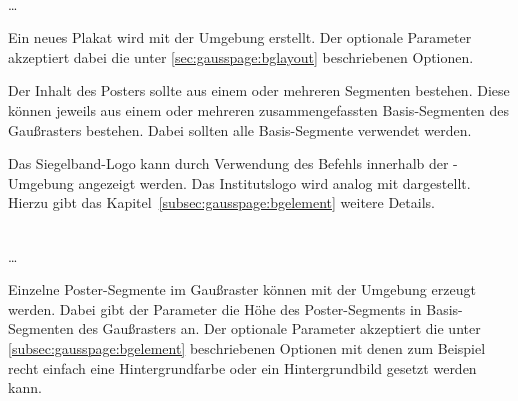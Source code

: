 
\begin{Declaration}
    \\
  \quad\dots\\
\end{Declaration}

Ein neues Plakat wird mit der Umgebung  erstellt.
Der optionale Parameter  akzeptiert dabei die
unter \ref{sec:gausspage:bglayout} beschriebenen Optionen.

Der Inhalt des Posters sollte aus einem oder mehreren Segmenten bestehen.
Diese können jeweils aus einem oder mehreren zusammengefassten Basis-Segmenten
des Gaußrasters bestehen. Dabei sollten alle Basis-Segmente verwendet werden.

\begin{sloppypar}
Das Siegelband-Logo kann durch Verwendung des Befehls 
innerhalb der -Umgebung angezeigt werden.
Das Institutslogo wird analog mit 
dargestellt. Hierzu gibt das Kapitel~\ref{subsec:gausspage:bgelement}
weitere Details.
\end{sloppypar}

\begin{Declaration}
    \\
  \quad\dots\\
\end{Declaration}

Einzelne Poster-Segmente im Gaußraster können mit der Umgebung
 erzeugt werden.
Dabei gibt der Parameter  die Höhe des
Poster-Segments in Basis-Segmenten des Gaußrasters an.
Der optionale Parameter  akzeptiert die
unter \ref{subsec:gausspage:bgelement} beschriebenen Optionen mit
denen zum Beispiel recht einfach eine Hintergrundfarbe oder ein Hintergrundbild
gesetzt werden kann.

